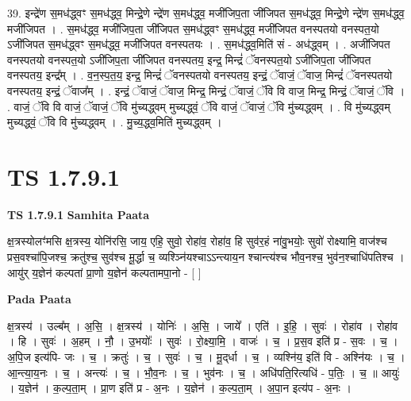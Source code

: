 \documentclass[17pt]{extarticle}
\begin{document}
39. इन्द्रे॑ण स॒मध॑द्ध्वꣳ स॒मध॑द्ध्व॒ मिन्द्रे॒णे न्द्रे॑ण स॒मध॑द्ध्व॒ मजी॑जिप॒ता जी॑जिपत स॒मध॑द्ध्व॒ मिन्द्रे॒णे न्द्रे॑ण स॒मध॑द्ध्व॒ मजी॑जिपत । . स॒मध॑द्ध्व॒ मजी॑जिप॒ता जी॑जिपत स॒मध॑द्ध्वꣳ स॒मध॑द्ध्व॒ मजी॑जिपत वनस्पतयो वनस्पत॒यो ऽजी॑जिपत स॒मध॑द्ध्वꣳ स॒मध॑द्ध्व॒ मजी॑जिपत वनस्पतयः । . स॒मध॑द्ध्व॒मिति॑ सं - अध॑द्ध्वम् । . अजी॑जिपत वनस्पतयो वनस्पत॒यो ऽजी॑जिप॒ता जी॑जिपत वनस्पतय॒ इन्द्र॒ मिन्द्रं॑ ॅवनस्पत॒यो ऽजी॑जिप॒ता जी॑जिपत वनस्पतय॒ इन्द्र᳚म् । . व॒न॒स्प॒त॒य॒ इन्द्र॒ मिन्द्रं॑ ॅवनस्पतयो वनस्पतय॒ इन्द्रं॒ ॅवाजं॒ ॅवाज॒ मिन्द्रं॑ ॅवनस्पतयो वनस्पतय॒ इन्द्रं॒ ॅवाज᳚म् । . इन्द्रं॒ ॅवाजं॒ ॅवाज॒ मिन्द्र॒ मिन्द्रं॒ ॅवाजं॒ ॅवि वि वाज॒ मिन्द्र॒ मिन्द्रं॒ ॅवाजं॒ ॅवि । . वाजं॒ ॅवि वि वाजं॒ ॅवाजं॒ ॅवि मु॑च्यद्ध्वम् मुच्यद्ध्वं॒ ॅवि वाजं॒ ॅवाजं॒ ॅवि मु॑च्यद्ध्वम् । . वि मु॑च्यद्ध्वम् मुच्यद्ध्वं॒ ॅवि वि मु॑च्यद्ध्वम् । . मु॒च्य॒द्ध्व॒मिति॑ मुच्यद्ध्वम् । \newline
\pagebreak
{}
\section*{ TS 1.7.9.1 }

\textbf{TS 1.7.9.1 } \newline
\textbf{Samhita Paata} \newline

क्ष॒त्रस्योलꣳ॑मसि क्ष॒त्रस्य॒ योनि॑रसि॒ जाय॒ एहि॒ सुवो॒ रोहा॑व॒ रोहा॑व॒ हि सुव॑र॒हं ना॑वु॒भयोः॒ सुवो॑ रोक्ष्यामि॒ वाज॑श्च प्रस॒वश्चा॑पि॒जश्च॒ क्रतु॑श्च॒ सुव॑श्च मू॒र्द्धा च॒ व्यश्ञ्नि॑यश्चाऽऽन्त्याय॒न श्चान्त्य॑श्च भौव॒नश्च॒ भुव॑न॒श्चाधि॑पतिश्च । आयु॑र् य॒ज्ञेन॑ कल्पतां प्रा॒णो य॒ज्ञेन॑ कल्पतामपा॒नो - [ ] \newline

\textbf{Pada Paata} \newline

क्ष॒त्रस्य॑ । उल्ब᳚म् । अ॒सि॒ । क्ष॒त्रस्य॑ । योनिः॑ । अ॒सि॒ । जाये᳚ । एति॑ । इ॒हि॒ । सुवः॑ । रोहा॑व । रोहा॑व । हि । सुवः॑ । अ॒हम् । नौ॒ । उ॒भयोः᳚ । सुवः॑ । रो॒क्ष्या॒मि॒ । वाजः॑ । च॒ । प्र॒स॒व इति॑ प्र - स॒वः । च॒ । अ॒पि॒ज इत्य॑पि- जः । च॒ । क्रतुः॑ । च॒ । सुवः॑ । च॒ । मू॒द्‌र्धा । च॒ । व्यश्नि॑य॒ इति॑ वि - अश्नि॑यः । च॒ । आ॒न्त्या॒य॒नः । च॒ । अन्त्यः॑ । च॒ । भौ॒व॒नः । च॒ । भुव॑नः । च॒ । अधि॑पति॒रित्यधि॑ - प॒तिः॒ । च॒ ॥ आयुः॑ । य॒ज्ञेन॑ । क॒ल्प॒ता॒म् । प्रा॒ण इति॑ प्र - अ॒नः । य॒ज्ञेन॑ । क॒ल्प॒ता॒म् । अ॒पा॒न इत्य॑प - अ॒नः ।  \newline
\end{document}
